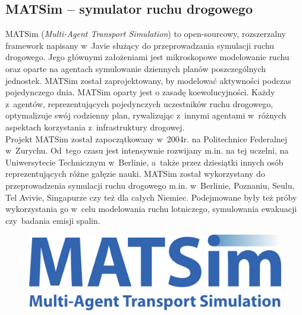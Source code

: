 \subsection{MATSim -- symulator ruchu drogowego}
MATSim (\textit{Multi-Agent Transport Simulation}) to open-sourcowy, rozszerzalny framework napisany w~Javie służący do przeprowadzania symulacji ruchu drogowego. Jego głównymi założeniami jest mikroskopowe modelowanie ruchu oraz oparte na agentach symulowanie dziennych planów poszczególnych jednostek. MATSim został zaprojektowany, by modelować aktywności podczas pojedynczego dnia. MATSim oparty jest o zasadę koewolucyjności. Każdy z~agentów, reprezentujących pojedynczych uczestników ruchu drogowego, optymalizuje swój codzienny plan, rywalizując z~innymi agentami w~różnych aspektach korzystania z~infrastruktury drogowej.\\
Projekt MATSim został zapoczątkowany w~2004r. na Politechnice Federalnej w~Zurychu.\cite{matsim} Od~tego czasu jest intensywnie rozwijany m.in. na tej uczelni, na Uniwersytecie Technicznym w~Berlinie, a~także przez dziesiątki innych osób reprezentujących różne gałęzie nauki. MATSim został wykorzystany do przeprowadzenia symulacji ruchu drogowego m.in. w~Berlinie, Poznaniu, Seulu, Tel Avivie, Singapurze czy też dla całych Niemiec. Podejmowane były też próby wykorzystania go w~celu modelowania ruchu lotniczego, symulowania ewakuacji czy~badania emisji spalin.
    \begin{figure}[h]
        \includegraphics[width=\textwidth]{images/mopsim/matsim_logo.png}
    \end{figure}
